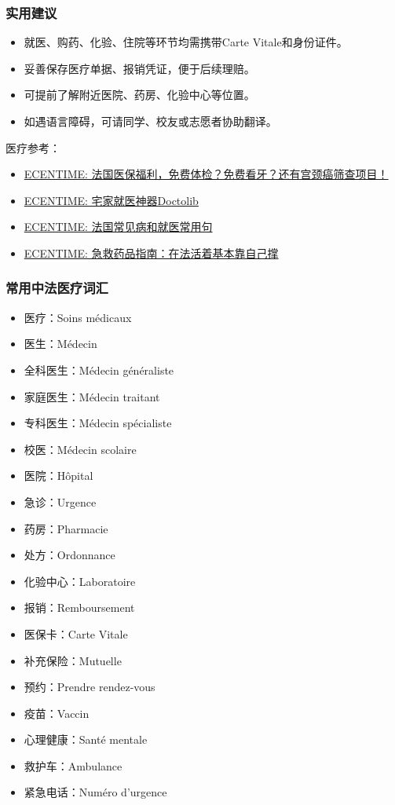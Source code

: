 \subsubsection{实用建议}
\begin{itemize}
    \item 就医、购药、化验、住院等环节均需携带Carte Vitale和身份证件。
    \item 妥善保存医疗单据、报销凭证，便于后续理赔。
    \item 可提前了解附近医院、药房、化验中心等位置。
    \item 如遇语言障碍，可请同学、校友或志愿者协助翻译。
\end{itemize}

医疗参考：
\begin{itemize}
    \item \href{https://www.ecentime.com/article/ecentime-ameli-gratuit}{ECENTIME: 法国医保福利，免费体检？免费看牙？还有宫颈癌筛查项目！}
    \item \href{https://www.ecentime.com/article/comment-utiliser-doctolib-pendant-le-confinement}{ECENTIME: 宅家就医神器Doctolib}
    \item \href{https://www.dealmoon.fr/guide/1366}{ECENTIME: 法国常见病和就医常用句}
    \item \href{https://www.ecentime.com/article/2018-pharmacie-list}{ECENTIME: 急救药品指南：在法活着基本靠自己撑}
\end{itemize}

\subsubsection{常用中法医疗词汇}
\begin{itemize}
    \item 医疗：Soins médicaux
    \item 医生：Médecin
    \item 全科医生：Médecin généraliste
    \item 家庭医生：Médecin traitant
    \item 专科医生：Médecin spécialiste
    \item 校医：Médecin scolaire
    \item 医院：Hôpital
    \item 急诊：Urgence
    \item 药房：Pharmacie
    \item 处方：Ordonnance
    \item 化验中心：Laboratoire
    \item 报销：Remboursement
    \item 医保卡：Carte Vitale
    \item 补充保险：Mutuelle
    \item 预约：Prendre rendez-vous
    \item 疫苗：Vaccin
    \item 心理健康：Santé mentale
    \item 救护车：Ambulance
    \item 紧急电话：Numéro d’urgence
\end{itemize}
